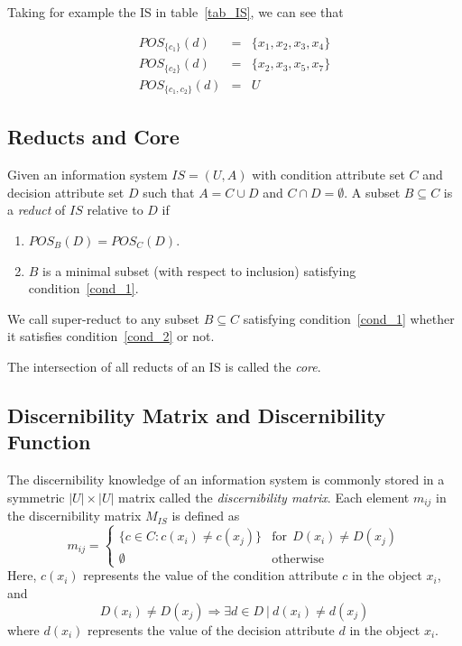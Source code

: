 \documentclass[authoryear,11pt]{elsarticle}
\begin{document}
  Taking for example the IS in table~\ref{tab_IS}, we can see that
  
  $$\begin{array}{lcc}
  POS_{\lbrace c_1 \rbrace}(d)     &=& \lbrace x_1,x_2,x_3,x_4 \rbrace\\
  POS_{\lbrace c_2 \rbrace}(d)     &=& \lbrace x_2,x_3,x_5,x_7 \rbrace\\
  POS_{\lbrace c_1, c_2 \rbrace}(d)&=& U
  \end{array}$$
 
\subsection{Reducts and Core}\label{def_reduct}
  Given an information system $IS=(U,A)$ with condition attribute set $C$ and decision attribute set
  $D$ such that $A=C \cup D$ and $C \cap D =\emptyset$. A subset $B \subseteq C$ is a \textit{reduct} 
  of $IS$ relative to $D$ if
  \begin{enumerate}
  	\item $POS_B(D)=POS_C(D)$. \label{cond_1}
  	\item $B$ is a minimal subset (with respect to inclusion) satisfying condition~\ref{cond_1}.\label{cond_2}
  \end{enumerate}

  We call super-reduct to any subset $B \subseteq C$ satisfying condition~\ref{cond_1} whether it satisfies
  condition~\ref{cond_2} or not.
  
  The intersection of all reducts of an IS is called the \textit{core}.
  
\subsection{Discernibility Matrix and Discernibility Function}
  The discernibility knowledge of an information system is commonly stored in a symmetric $|U| \times |U|$
  matrix called the \textit{discernibility matrix}. Each element $m_{ij}$ in the discernibility matrix 
  $M_{IS}$ is defined as   
  \begin{equation}
  	m_{ij}=\left\lbrace\begin{array}{cl}
  			\lbrace c \in C: c(x_i) \neq c(x_j) \rbrace & \mathrm{for~~}D(x_i) \neq D(x_j)\\
  			\emptyset 								   & \mathrm{otherwise} 
  	\end{array}\right.
  \end{equation}  
  Here, $c(x_i)$ represents the value of the condition attribute $c$ in the object $x_i$, and 
  $$D(x_i) \neq D(x_j) \Rightarrow \exists d \in D~ |~ d(x_i) \neq d(x_j)$$ 
  where $d(x_i)$ represents the value  of the decision attribute $d$ in the object $x_i$.
  
\end{document}
